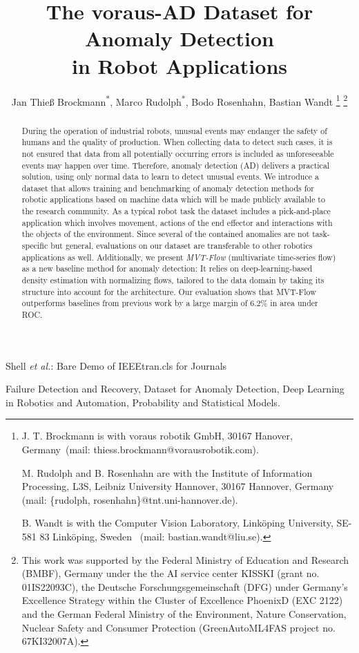 \documentclass[journal]{IEEEtran}
\author{
	Jan Thieß Brockmann\textsuperscript{*}\orcidA{}, 
	Marco Rudolph\textsuperscript{*}\orcidB{}, 
	Bodo Rosenhahn\orcidC{}, 
	Bastian Wandt\orcidD{}
\thanks{J. T. Brockmann is with voraus robotik GmbH, 30167 Hanover, Germany~(mail: thiess.brockmann@vorausrobotik.com).


	M. Rudolph and B. Rosenhahn are with the Institute of Information
Processing, L3S, Leibniz University Hannover, 30167 Hannover, Germany (mail: \{rudolph, rosenhahn\}@tnt.uni-hannover.de).


	B. Wandt is with the Computer Vision Laboratory, Linköping University, SE-581 83 Linköping, Sweden
~(mail: bastian.wandt@liu.se).}
	\thanks{
	This work was supported by the Federal Ministry of Education and Research (BMBF), Germany under the the AI service center KISSKI (grant no. 01IS22093C), the Deutsche Forschungsgemeinschaft (DFG) under Germany’s Excellence Strategy within the Cluster of Excellence PhoenixD (EXC 2122) and the German Federal Ministry of the Environment, Nature Conservation, Nuclear Safety and Consumer Protection (GreenAutoML4FAS project no. 67KI32007A).
}
}
\begin{document}
\title{The voraus-AD Dataset for Anomaly Detection\\ in Robot Applications}

\markboth{}
{Shell \MakeLowercase{\textit{et al.}}: Bare Demo of IEEEtran.cls for Journals}

\maketitle

\begin{abstract}
During the operation of industrial robots, unusual events may endanger the safety of humans and the quality of production.
When collecting data to detect such cases, it is not ensured that data from all potentially occurring errors is included as unforeseeable events may happen over time.
Therefore, anomaly detection (AD) delivers a practical solution, using only normal data to learn to detect unusual events.
We introduce a dataset that allows training and benchmarking of anomaly detection methods for robotic applications based on machine data which will be made publicly available to the research community.
As a typical robot task the dataset includes a pick-and-place application which involves movement, actions of the end effector and interactions with the objects of the environment.
Since several of the contained anomalies are not task-specific but general, evaluations on our dataset {are transferable to} other robotics applications as well.
Additionally, we present \textit{MVT-Flow} (multivariate time-series flow) as a new baseline method for anomaly detection:
It relies on deep-learning-based density estimation with normalizing flows, tailored to the data domain by taking its structure into account for the architecture.
Our evaluation shows that MVT-Flow outperforms baselines from previous work by a large margin {of 6.2\% in area under ROC}.

\end{abstract}
\begin{IEEEkeywords}
Failure Detection and Recovery, Dataset for Anomaly Detection, Deep Learning in Robotics and Automation, Probability and Statistical Models.
\end{IEEEkeywords}

\maketitle
\end{document}
